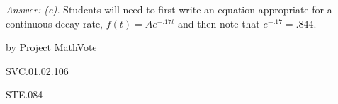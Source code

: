 {\it Answer:  (c).} Students will need to first write an equation appropriate for a continuous decay rate, $f(t)=Ae^{-.17t}$ and then note that $e^{-.17}=.844$.

\medskip
by Project MathVote

SVC.01.02.106

STE.084

